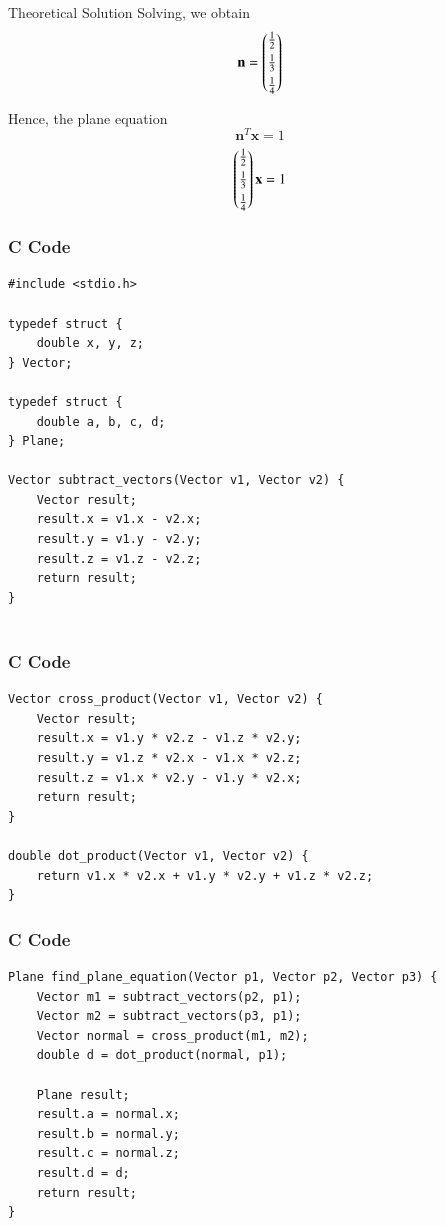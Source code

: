 \documentclass{beamer}
\begin{document}
\begin{frame}{Theoretical Solution}
Solving, we obtain
\[
\mathbf{n} = 
\begin{pmatrix}\tfrac{1}{2}\\[4pt]\tfrac{1}{3}\\[4pt]\tfrac{1}{4}\end{pmatrix}
\]

Hence, the plane equation 
\[
\mathbf{n}^T \mathbf{x} = 1 
\]
\[
\begin{pmatrix}\tfrac{1}{2}\\[4pt]\tfrac{1}{3}\\[4pt]\tfrac{1}{4}\end{pmatrix}\mathbf{x} =1
\]
\end{frame}


\begin{frame}[fragile]
    \frametitle{C Code}

    \begin{lstlisting}
#include <stdio.h>

typedef struct {
    double x, y, z;
} Vector;

typedef struct {
    double a, b, c, d;
} Plane;

Vector subtract_vectors(Vector v1, Vector v2) {
    Vector result;
    result.x = v1.x - v2.x;
    result.y = v1.y - v2.y;
    result.z = v1.z - v2.z;
    return result;
}


    \end{lstlisting}
\end{frame}

\begin{frame}[fragile]
    \frametitle{C Code}

    \begin{lstlisting}
Vector cross_product(Vector v1, Vector v2) {
    Vector result;
    result.x = v1.y * v2.z - v1.z * v2.y;
    result.y = v1.z * v2.x - v1.x * v2.z;
    result.z = v1.x * v2.y - v1.y * v2.x;
    return result;
}

double dot_product(Vector v1, Vector v2) {
    return v1.x * v2.x + v1.y * v2.y + v1.z * v2.z;
}

    \end{lstlisting}
\end{frame}
\begin{frame}[fragile]
    \frametitle{C Code}

    \begin{lstlisting}
Plane find_plane_equation(Vector p1, Vector p2, Vector p3) {
    Vector m1 = subtract_vectors(p2, p1);
    Vector m2 = subtract_vectors(p3, p1);
    Vector normal = cross_product(m1, m2);
    double d = dot_product(normal, p1);

    Plane result;
    result.a = normal.x;
    result.b = normal.y;
    result.c = normal.z;
    result.d = d;
    return result;
}


    \end{lstlisting}
\end{frame}
\end{document}
